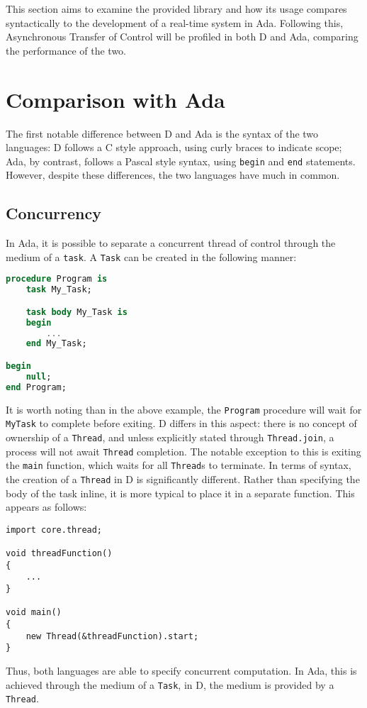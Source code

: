 
This section aims to examine the provided library and how its usage
compares syntactically to the development of a real-time system in Ada. 
Following this, Asynchronous Transfer of Control will be profiled in both D and
Ada, comparing the performance of the two. 

\section{Comparison with Ada}
The first notable difference between D and Ada is the syntax of the two languages: 
D follows a C style approach, using curly braces to indicate scope;
Ada, by contrast, follows a Pascal style syntax, using \texttt{begin} and
\texttt{end} statements. However, despite these differences,
the two languages have much in common. 

\subsection{Concurrency}
In Ada, it is possible to separate a concurrent thread of control through the
medium of a \texttt{task}. A \texttt{Task} can be created in the following manner: 
\begin{lstlisting}[basicstyle=\small,language=Ada]
procedure Program is 
    task My_Task; 

    task body My_Task is 
    begin
        ...
    end My_Task;

begin
    null; 
end Program;
\end{lstlisting}
It is worth noting than in the above example, the \texttt{Program} procedure will wait
for \texttt{My\textunderscore{}Task} to complete before exiting. D differs in this aspect: 
there is no concept of ownership of a \texttt{Thread}, and unless
explicitly stated through \texttt{Thread.join}, a process will not await
\texttt{Thread} completion. The notable exception to this is exiting the
\texttt{main} function, which waits for all \texttt{Thread}s to terminate. 
In terms of syntax, the creation of a
\texttt{Thread} in D is significantly different. Rather than specifying the body of
the task inline, it is more typical to place it in a separate function. This
appears as follows: 
\begin{lstlisting}[basicstyle=\small]
import core.thread; 

void threadFunction()
{
    ...
}

void main()
{
    new Thread(&threadFunction).start;
}
\end{lstlisting}
Thus, both languages are able to specify concurrent computation. In
Ada, this is achieved through the medium of a \texttt{Task}, in D, the medium
is provided by a \texttt{Thread}. 

